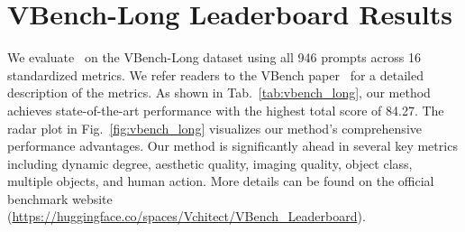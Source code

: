 \clearpage
\maketitlesupplementary

\renewcommand{\thesection}{\Alph{section}}
\setcounter{section}{0}






\section{VBench-Long Leaderboard Results}
We evaluate \method~on the VBench-Long dataset using all 946 prompts across 16 standardized metrics. We refer readers to the VBench paper~\cite{huang2024vbench} for a detailed description of the metrics. As shown in Tab.~\ref{tab:vbench_long}, our method achieves state-of-the-art performance with the highest total score of 84.27. The radar plot in Fig.~\ref{fig:vbench_long} visualizes our method's comprehensive performance advantages. Our method is significantly ahead in several key metrics including dynamic degree, aesthetic quality, imaging quality, object class, multiple objects, and human action. More details can be found on the official benchmark website (\url{https://huggingface.co/spaces/Vchitect/VBench_Leaderboard}).




















